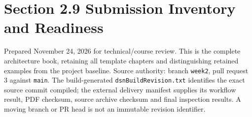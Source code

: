 \section{Section 2.9 Submission Inventory and Readiness}
\label{Section:SubmissionPackage}
Prepared November 24, 2026 for technical/course review. This is the complete
architecture book, retaining all template chapters and distinguishing retained
examples from the project baseline. Source authority: branch \texttt{week2},
pull request 3 against \texttt{main}. The build-generated
\texttt{dsnBuildRevision.txt} identifies the exact source commit compiled;
the external delivery manifest supplies its workflow result, PDF checksum,
source archive checksum and final inspection results. A moving branch or PR
head is not an immutable revision identifier.

